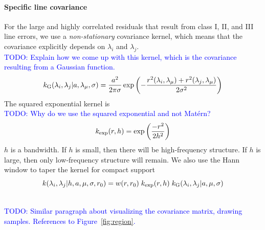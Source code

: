 \documentclass[iop,floatfix]{emulateapj}
\newcommand{\matern}{Mat\'{e}rn}
\newcommand{\todo}[1]{ \textcolor{Blue}{\\TODO: #1}}
\begin{document}
\paragraph{Specific line covariance} For the large and highly correlated
 residuals that result from class I, II, and III line errors, we use a
 \emph{non-stationary} covariance kernel, which means that the covariance
 explicitly depends on $\lambda_i$ and $\lambda_j$.
\todo{Explain how we come up with this kernel, which is the covariance
 resulting from a Gaussian function.}
\begin{equation}
  k_{\rm G}(\lambda_i, \lambda_j | a, \lambda_\mu, \sigma) = 
   \frac{a^2}{2 \pi \sigma} \exp \left ( - \frac{r^2(\lambda_i, \lambda_\mu) 
    + r^2(\lambda_j, \lambda_\mu)}{2 \sigma^2}\right )
\end{equation}
The squared exponential kernel is
\todo{Why do we use the squared exponential and not \matern?}
\begin{equation}
  k_{ \rm exp}(r, h) = \exp \left ( \frac{- r^2 }{2 h^2} \right )
\end{equation}
$h$ is a bandwidth. 
If $h$ is small, then there will be high-frequency structure. If $h$ is large,
 then only low-frequency structure will remain. 
We also use the Hann window to taper the kernel for compact support
\begin{equation}
  k(\lambda_i, \lambda_j | h, a, \mu, \sigma, r_0) = 
   w(r, r_0)\; k_{ \rm exp}(r, h) \; 
   k_{\rm G}(\lambda_i, \lambda_j | a, \mu, \sigma)
\end{equation}

\todo{Similar paragraph about visualizing the covariance matrix, drawing
  samples. References to Figure~\ref{fig:region}.}
\end{document}
